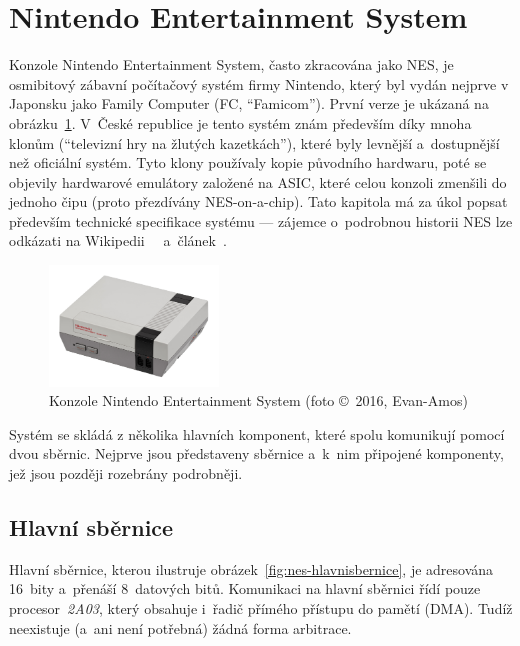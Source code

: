 \section{Nintendo Entertainment System}
Konzole Nintendo Entertainment System, často zkracována jako NES, je osmibitový zábavní počítačový systém firmy Nintendo, který byl vydán nejprve v Japonsku jako Family Computer (FC, \enquote{Famicom}). První verze je ukázaná na obrázku~\ref{fig:nes}. V~České republice je tento systém znám především díky mnoha klonům (\enquote{televizní hry na žlutých kazetkách}), které byly levnější a~dostupnější než oficiální systém. Tyto klony používaly kopie původního hardwaru, poté se objevily hardwarové emulátory založené na ASIC, které celou konzoli zmenšili do jednoho čipu (proto přezdívány NES-on-a-chip). Tato kapitola má za úkol popsat především technické specifikace systému --- zájemce o~podrobnou historii NES lze odkázati na Wikipedii~\cite{Wikipedia:NES}~\cite{Wikipedia:famiclone} a~článek~\cite{Svara:polystation}.

\begin{figure}[ht!]
	\centering
	\caption{Konzole Nintendo Entertainment System (foto \copyright~2016, Evan-Amos)}
	\label{fig:nes}
	\includegraphics[width=0.4\textwidth]{images/nes.jpg}
\end{figure}


Systém se skládá z několika hlavních komponent, které spolu komunikují pomocí dvou sběrnic. Nejprve jsou představeny sběrnice a~k~nim připojené komponenty, jež jsou později rozebrány podrobněji.

\subsection{Hlavní sběrnice}
Hlavní sběrnice, kterou ilustruje obrázek~\ref{fig:nes-hlavnisbernice}, je adresována 16~bity a~přenáší 8~datových bitů. Komunikaci na hlavní sběrnici řídí pouze procesor~\emph{2A03}, který obsahuje i~řadič přímého přístupu do pamětí (DMA). Tudíž neexistuje (a~ani není potřebná) žádná forma arbitrace.

